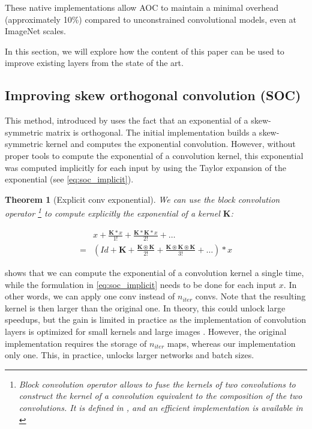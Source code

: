 \documentclass[10pt]{article}
\theoremstyle{plain}
\newtheorem{theorem}{Theorem}[section]
\theoremstyle{definition}
\theoremstyle{remark}
\newcommand{\mathbconv}{\circledast} %
\newcommand{\kernel}[1]{\mathbf{#1}}
\begin{document}
    These native implementations allow AOC to maintain a minimal overhead (approximately 10\%) compared to unconstrained convolutional models, even at ImageNet scales.
    

    In this section, we will explore how the content of this paper can be used to improve existing layers from the state of the art.
    
    \subsection{Improving skew orthogonal convolution (SOC)\cite{singla_improved_2022}
    \label{sec:improving_soc}
    } This method, introduced by \cite{singla_improved_2022} uses the fact that an exponential of a skew-symmetric matrix is orthogonal. The initial implementation builds a skew-symmetric kernel and computes the exponential convolution. However, without proper tools to compute the exponential of a convolution kernel, this exponential was computed implicitly for each input by using the Taylor expansion of the exponential (see \cref{eq:soc_implicit}).

        \begin{theorem}[Explicit conv exponential]

            We can use the block convolution operator \footnote{Block convolution operator allows to fuse the kernels of two convolutions to construct the kernel of a convolution equivalent to the composition of the two convolutions. It is defined in \cite{li_preventing_2019}, and an efficient implementation is available in \cite{boissin2025adaptive}} to compute explicitly the exponential of a kernel $\kernel{K}$:

            \begin{align}
                & x + \frac{\kernel{K}*x}{1!} + \frac{\kernel{K}*\kernel{K}*x}{2!} + \dots \label{eq:soc_implicit} \\
                = & \left(Id + \kernel{K} + \frac{\kernel{K} \mathbconv \kernel{K}}{2!} + \frac{\kernel{K} \mathbconv \kernel{K} \mathbconv \kernel{K} }{3!} + \dots \right) * x \label{eq:soc_explicit}            
            \end{align}
        \end{theorem}

          shows that we can compute the exponential of a convolution kernel a single time, while the formulation in \cref{eq:soc_implicit} needs to be done for each input $x$. In other words, we can apply one conv instead of $n_{iter}$ convs. Note that the resulting kernel is then larger than the original one. In theory, this could unlock large speedups, but the gain is limited in practice as the implementation of convolution layers is optimized for small kernels and large images \cite{ding_scaling_2022}. However, the original implementation requires the storage of $n_{iter}$ maps, whereas our implementation only one. This, in practice, unlocks larger networks and batch sizes.
\end{document}
